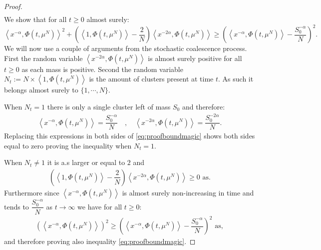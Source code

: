 \documentclass[11pt,a4paper]{article}
\begin{document}
\begin{proof}
\begin{multline*}
    \end{multline*}
    We show that for all $t\geq 0$ almost surely:
    \begin{equation}\label{eq:proofboundmagic}
        \left\langle x^{-\alpha},\Phi(t,\mu^N)\right\rangle^2 + \left(\left\langle 1,\Phi(t,\mu^N)\right\rangle - \dfrac{2}{N}\right)\left\langle x^{-2\alpha},\Phi(t,\mu^N)\right\rangle
        \geq \left(\left\langle x^{-\alpha},\Phi(t,\mu^N)\right\rangle- \dfrac{S_0^{-\alpha}}{N}\right)^2.
    \end{equation}
    We will now use a couple of arguments from the stochastic coalescence process. First the random variable $\left\langle x^{-2\alpha},\Phi(t,\mu^N)\right\rangle$ is almost surely positive for all $t\geq 0$ as each mass is positive. Second the random variable $N_t := N\times\left\langle 1,\Phi(t,\mu^N)\right\rangle$ is the amount of clusters present at time $t$. As such it belongs almost surely to $\lbrace 1,\cdots,N\rbrace$. 
    
    When $N_t = 1$ there is only a single cluster left of mass $S_0$ and therefore:
    \begin{align*}
        \left\langle x^{-\alpha},\Phi(t,\mu^N)\right\rangle = \dfrac{S_0^{-\alpha}}{N} \quad,\quad \left\langle x^{-2\alpha},\Phi(t,\mu^N)\right\rangle = \dfrac{S_0^{-2\alpha}}{N}.
    \end{align*}
    Replacing this expressions in both sides of \eqref{eq:proofboundmagic} shows both sides equal to zero proving the inequality when $N_t = 1$.
    
    When $N_t \neq 1$ it is a.s larger or equal to $2$ and
    \begin{align*}
        \left(\left\langle 1,\Phi(t,\mu^N)\right\rangle - \dfrac{2}{N}\right)\left\langle x^{-2\alpha},\Phi(t,\mu^N)\right\rangle \geq 0 \text{ as}.
    \end{align*}
    Furthermore since $\left\langle x^{-\alpha},\Phi(t,\mu^N)\right\rangle$ is almost surely non-increasing in time and tends to $\dfrac{S_0^{-\alpha}}{N}$ as $t\to \infty$ we have for all $t\geq 0$:
    \begin{align*}
        \left(\left\langle x^{-\alpha},\Phi(t,\mu^N)\right\rangle\right)^2 \geq \left(\left\langle x^{-\alpha},\Phi(t,\mu^N)\right\rangle - \dfrac{S_0^{-\alpha}}{N}\right)^2 \text{ as},
    \end{align*}
    and therefore proving also inequality \eqref{eq:proofboundmagic}. 


\end{proof}
\end{document}
